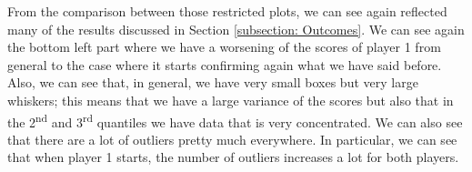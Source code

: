 From the comparison between those restricted plots, we can see again reflected many of the results discussed in Section \ref{subsection: Outcomes}.
We can see again the bottom left part where we have a worsening of the scores of player 1 from general to the case where it starts confirming again what we have said before. 
Also, we can see that, in general, we have very small boxes but very large whiskers; this means that we have a large variance of the scores but also that in the 2\textsuperscript{nd} and 3\textsuperscript{rd} quantiles we have data that is very concentrated. We can also see that there are a lot of outliers pretty much everywhere. In particular, we can see that when player 1 starts, the number of outliers increases a lot for both players.